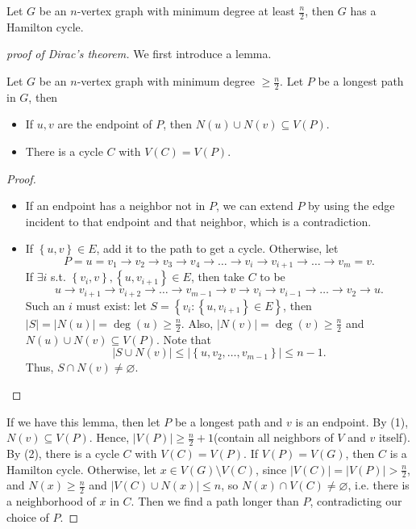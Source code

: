 \begin{theorem}[Dirac, 1952]
    Let \(G\) be an \(n\)-vertex graph with minimum degree at least \(\frac{n}{2}\), then \(G\) has a Hamilton cycle.    
\end{theorem}

\begin{proof}[proof of Dirac's theorem]
    We first introduce a lemma.
    \begin{lemma}
        Let \(G\) be an \(n\)-vertex graph with minimum degree \(\ge \frac{n}{2}\). Let \(P\) be a longest path in \(G\), then 
        \begin{itemize}
            \item [(1)] If \(u, v\) are the endpoint of \(P\), then \(N(u) \cup N(v) \subseteq V(P)\). 
            \item [(2)] There is a cycle \(C\) with \(V(C) = V(P)\).     
        \end{itemize}     
    \end{lemma}
    \begin{proof}
    \hfill
        \begin{itemize}
            \item [(1)] If an endpoint has a neighbor not in \(P\), we can extend \(P\) by using the edge incident to that endpoint and that neighbor, which is a contradiction.  
            \item [(2)] If \(\left\{ u, v \right\} \in E \), add it to the path to get a cycle. Otherwise, let 
            \[
                P = u = v_1 \to v_2 \to v_3 \to v_4 \to \dots \to v_i \to v_{i+1} \to \dots \to v_m = v.
            \]
            If \(\exists i\) s.t. \(\left\{ v_i, v \right\}, \left\{ u, v_{i+1} \right\} \in E  \), then take \(C\) to be 
            \[
                u \to v_{i+1} \to v_{i+2} \to \dots \to v_{m-1} \to v \to v_i \to v_{i-1} \to \dots \to v_2 \to u.
            \]  
            Such an \(i\) must exist: let \(S = \left\{ v_i : \left\{ u, v_{i+1} \right\} \in E  \right\} \), then \(\vert S \vert = \vert N(u) \vert = \deg(u) \ge \frac{n}{2} \). Also, \(\vert N(v) \vert = \deg(v) \ge \frac{n}{2} \) and \(N(u) \cup N(v) \subseteq V(P)\). Note that 
            \[
                \vert S \cup N(v) \vert \le \vert \left\{ u, v_2, \dots , v_{m-1} \right\}  \vert \le n - 1.  
            \]    
            Thus, \(S \cap N(v) \neq \varnothing\). 
        \end{itemize}
    \end{proof}

    If we have this lemma, then let \(P\) be a longest path and \(v\) is an endpoint. By (1), \(N(v) \subseteq V(P)\). Hence, \(\vert V(P) \vert \ge \frac{n}{2} + 1 \)(contain all neighbors of \(V\) and \(v\) itself). By (2), there is a cycle \(C\) with \(V(C) = V(P)\). If \(V(P) = V(G)\), then \(C\) is a Hamilton cycle. Otherwise, let \(x \in V(G) \setminus V(C)\), since \(\vert V(C) \vert = \vert V(P) \vert > \frac{n}{2}  \), and \(N(x) \ge \frac{n}{2}\) and \(\vert V(C) \cup N(x) \vert \le n \), so \(N(x) \cap V(C) \neq \varnothing \), i.e. there is a neighborhood of \(x\) in \(C\). Then we find a path longer than \(P\), contradicting our choice of \(P\).                
\end{proof}

